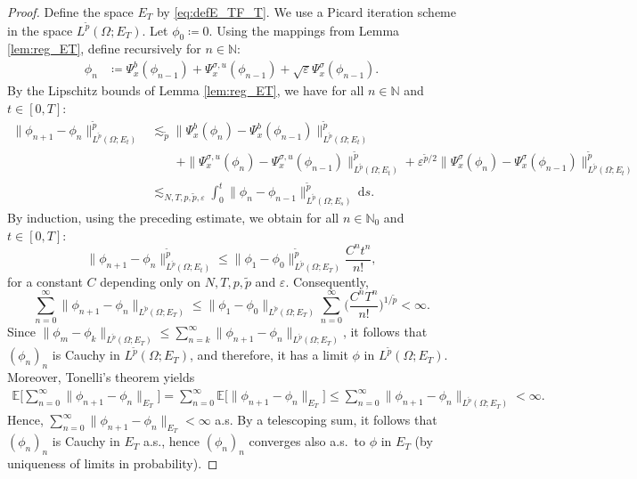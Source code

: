 \documentclass[10pt,a4paper]{amsart}
\numberwithin{equation}{section}
\newcommand{\N}{\mathbb{N}}
\newcommand{\ceqq}{\coloneqq}
\newcommand{\E}{{\mathbb E}}
\newcommand{\eps}{\varepsilon}
\newcommand{\Om}{\Omega}
\newcommand{\dd}{\,\mathrm{d}}
\begin{document}
\begin{proof} Define the space $E_T$ by \eqref{eq:defE_TF_T}. We use a Picard iteration scheme in the space $L^{\tilde p}(\Om;E_T)$. 
Let $\phi_0\ceqq 0$. Using the mappings from Lemma \ref{lem:reg_ET}, define recursively for $n\in\N$:
\begin{align}\label{eq:phi_n recursion}
\phi_n &\ceqq  \Psi_x^b(\phi_{n-1})+\Psi_x^{\sigma,u}(\phi_{n-1})+\sqrt{\eps} \Psi_x^\sigma(\phi_{n-1}). 
\end{align}  
By the Lipschitz bounds of Lemma \ref{lem:reg_ET}, we have for all $n\in\N$ and $t\in[0,T]$:
\begin{align*}
\|\phi_{n+1}-\phi_n\|_{L^{\tilde p}(\Om;E_t)}^{\tilde p} 
&\lesssim_{\tilde p} 
\|\Psi_x^b(\phi_{n})-\Psi_x^b(\phi_{n-1})\|_{L^{\tilde p}(\Om;E_t)}^{\tilde p}\\
&\qquad+\|\Psi_x^{\sigma,u}(\phi_{n})-\Psi_x^{\sigma,u}(\phi_{n-1})\|_{L^{\tilde p}(\Om;E_t)}^{\tilde p}+
\eps^{\tilde p/2}\|\Psi_x^\sigma(\phi_{n})-\Psi_x^\sigma(\phi_{n-1})\|_{L^{\tilde p}(\Om;E_t)}^{\tilde p} \\
&\lesssim_{N,T,p,\tilde p,\eps} \int_0^t \| \phi_n - \phi_{n-1}\|_{L^{\tilde p}(\Om;E_s)}^{\tilde p}\dd s. 
\end{align*}
By induction, using the preceding estimate, we obtain for all $n\in\N_0$ and $t\in[0,T]$:  
\[\|\phi_{n+1} - \phi_n\|_{L^{\tilde{p}}(\Om;E_t)}^{\tilde p} \leq \|\phi_1 - \phi_0\|_{L^{\tilde{p}}(\Om;E_T)}^{\tilde p} \frac{C^n t^n}{n!}, \]
for a constant $C$ depending only on $N,T,p,\tilde p$ and $\eps$. Consequently,
\[
\sum_{n=0}^{\infty}
\|\phi_{n+1}-\phi_n\|_{L^{\tilde p}(\Om;E_T)}
\leq
\|\phi_1-\phi_0\|_{L^{\tilde p}(\Om;E_T)}
\sum_{n=0}^{\infty}
\Big(\frac{C^nT^n}{n!}\Big)^{1/\tilde p}
<\infty.
\]
Since $\|\phi_{m}-\phi_k\|_{L^{\tilde p}(\Om;E_T)}\leq \sum_{n=k}^\infty \|\phi_{n+1}-\phi_n\|_{L^{\tilde p}(\Om;E_T)}$, it follows that   $(\phi_n)_n$ is
Cauchy in $L^{\tilde p}(\Om;E_T)$, and therefore, it has a limit $\phi$ in $L^{\tilde p}(\Om;E_T)$. 
Moreover, 
Tonelli's theorem yields
\begin{align*}
\E\Big[
\sum_{n=0}^{\infty}
\|\phi_{n+1}-\phi_n\|_{E_T}
\Big]=
\sum_{n=0}^{\infty}
\E\Big[
\|\phi_{n+1}-\phi_n\|_{E_T}
\Big] \leq
\sum_{n=0}^{\infty}
\|\phi_{n+1}-\phi_n\|_{L^{\tilde p}(\Om;E_T)}
<\infty.
\end{align*}
Hence, $\sum_{n=0}^{\infty}
\|\phi_{n+1}-\phi_n\|_{E_T}<\infty$ a.s.  
By a telescoping sum, it follows that 
$(\phi_n)_n$ is
Cauchy in $E_T$ a.s., hence $(\phi_n)_n$ converges also a.s.\ to $\phi$ in $E_T$ (by uniqueness of limits in probability). 



\end{proof}
\end{document}
